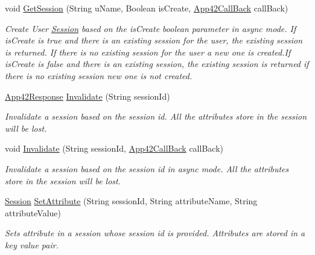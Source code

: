 \begin{DoxyCompactItemize}
void \hyperlink{classcom_1_1shephertz_1_1app42_1_1paas_1_1sdk_1_1csharp_1_1session_1_1_session_service_a166bdfb6e26cbf3af897c53e47939071}{Get\+Session} (String u\+Name, Boolean is\+Create, \hyperlink{interfacecom_1_1shephertz_1_1app42_1_1paas_1_1sdk_1_1csharp_1_1_app42_call_back}{App42\+Call\+Back} call\+Back)
\begin{DoxyCompactList}\small\item\em Create User \hyperlink{classcom_1_1shephertz_1_1app42_1_1paas_1_1sdk_1_1csharp_1_1session_1_1_session}{Session} based on the is\+Create boolean parameter in async mode. If is\+Create is true and there is an existing session for the user, the existing session is returned. If there is no existing session for the user a new one is created.\+If is\+Create is false and there is an existing session, the existing session is returned if there is no existing session new one is not created. \end{DoxyCompactList}\item 
\hyperlink{classcom_1_1shephertz_1_1app42_1_1paas_1_1sdk_1_1csharp_1_1_app42_response}{App42\+Response} \hyperlink{classcom_1_1shephertz_1_1app42_1_1paas_1_1sdk_1_1csharp_1_1session_1_1_session_service_a27fb63956d330140668d35b964c36b65}{Invalidate} (String session\+Id)
\begin{DoxyCompactList}\small\item\em Invalidate a session based on the session id. All the attributes store in the session will be lost. \end{DoxyCompactList}\item 
void \hyperlink{classcom_1_1shephertz_1_1app42_1_1paas_1_1sdk_1_1csharp_1_1session_1_1_session_service_a7f038b1a993e176488fcc62747c9a40b}{Invalidate} (String session\+Id, \hyperlink{interfacecom_1_1shephertz_1_1app42_1_1paas_1_1sdk_1_1csharp_1_1_app42_call_back}{App42\+Call\+Back} call\+Back)
\begin{DoxyCompactList}\small\item\em Invalidate a session based on the session id in async mode. All the attributes store in the session will be lost. \end{DoxyCompactList}\item 
\hyperlink{classcom_1_1shephertz_1_1app42_1_1paas_1_1sdk_1_1csharp_1_1session_1_1_session}{Session} \hyperlink{classcom_1_1shephertz_1_1app42_1_1paas_1_1sdk_1_1csharp_1_1session_1_1_session_service_af554ffd4fc8eb4b20cd92e5466ef4422}{Set\+Attribute} (String session\+Id, String attribute\+Name, String attribute\+Value)
\begin{DoxyCompactList}\small\item\em Sets attribute in a session whose session id is provided. Attributes are stored in a key value pair. \end{DoxyCompactList}\item 

\end{DoxyCompactItemize}
